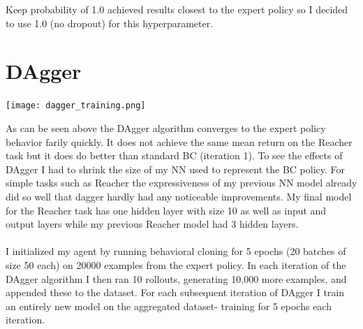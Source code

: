 \documentclass[12pt]{report}
\begin{document}
Keep probability of 1.0 achieved results closest to the expert policy so I decided to use 1.0 (no dropout) for this hyperparameter.
\newpage
\section*{DAgger}
\begin{center}
\texttt{[image: dagger\_training.png]}
\end{center}

As can be seen above the DAgger algorithm converges to the expert policy behavior farily quickly. It does not achieve the same mean return on the Reacher task but it does do better than standard BC (iteration 1). To see the effects of DAgger I had to shrink the size of my NN used to represent the BC policy. For simple tasks such as Reacher the expressiveness of my previous NN model already did so well that dagger hardly had any noticeable improvements. My final model for the Reacher task has one hidden layer with size 10 as well as input and output layers while my previous Reacher model had 3 hidden layers.\\
\\
I initialized my agent by running behavioral cloning for 5 epochs (20 batches of size 50 each) on 20000 examples from the expert policy. In each iteration of the DAgger algorithm I then ran 10 rollouts, generating 10,000 more examples, and appended these to the dataset. For each subsequent iteration of DAgger I train an entirely new model on the aggregated dataset- training for 5 epochs each iteration.
\end{document}
